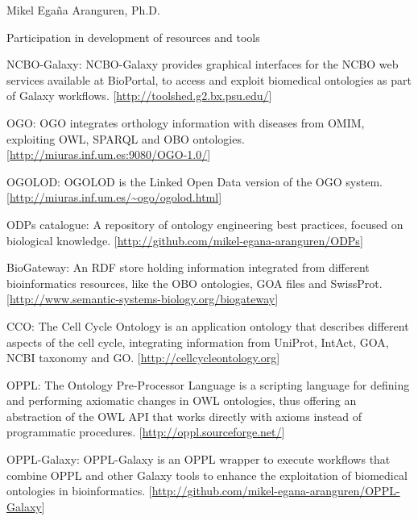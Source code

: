 \documentclass[english,11pt,a4paper,oneside]{article}
\begin{document}
\begin{cv}{Mikel Ega\~na Aranguren, Ph.D. }
\begin{cvlist}{Participation in development of resources and tools}
	\item [NCBO-Galaxy:] NCBO-Galaxy provides graphical interfaces for the NCBO web services available at BioPortal, to access and exploit biomedical ontologies as part of Galaxy workflows. 
	[\href{http://toolshed.g2.bx.psu.edu/}{http://toolshed.g2.bx.psu.edu/}]	
	
	\item [OGO:] OGO integrates orthology information with diseases from OMIM, exploiting OWL, SPARQL and OBO ontologies. 
	[\href{http://miuras.inf.um.es:9080/OGO-1.0/}{http://miuras.inf.um.es:9080/OGO-1.0/}]

	\item [OGOLOD:] OGOLOD is the Linked Open Data version of the OGO system. 
	[\href{http://miuras.inf.um.es/~ogo/ogolod.html}{http://miuras.inf.um.es/\~{}ogo/ogolod.html}]

	\item [ODPs catalogue:] 
	A repository of ontology engineering best practices, focused on biological knowledge. 
	 [\href{http://github.com/mikel-egana-aranguren/ODPs}{http://github.com/mikel-egana-aranguren/ODPs}]
	
	\item [BioGateway:] 
	An RDF store holding information integrated from different bioinformatics resources, like the OBO ontologies, GOA files and SwissProt.
	[\href{http://www.semantic-systems-biology.org/biogateway}{http://www.semantic-systems-biology.org/biogateway}]
	
	\item [CCO:] 
	The Cell Cycle Ontology is an application ontology that describes different aspects of the cell cycle, integrating information from  UniProt, IntAct, GOA, NCBI taxonomy and GO. 
	[\href{http://cellcycleontology.org}{http://cellcycleontology.org}]

	\item [OPPL:] 
	The Ontology Pre-Processor Language is a scripting language for defining and performing axiomatic changes in OWL ontologies, thus offering an abstraction of the OWL API that works directly with axioms instead of programmatic procedures.
	 [\href{http://oppl.sourceforge.net/}{http://oppl.sourceforge.net/}]

	\item [OPPL-Galaxy:] OPPL-Galaxy is an OPPL wrapper to execute workflows that combine OPPL and other Galaxy tools to enhance the exploitation of biomedical ontologies in bioinformatics. [\href{http://github.com/mikel-egana-aranguren/OPPL-Galaxy}{http://github.com/mikel-egana-aranguren/OPPL-Galaxy}]
	 

\end{cvlist}
\end{cv}
\end{document}
